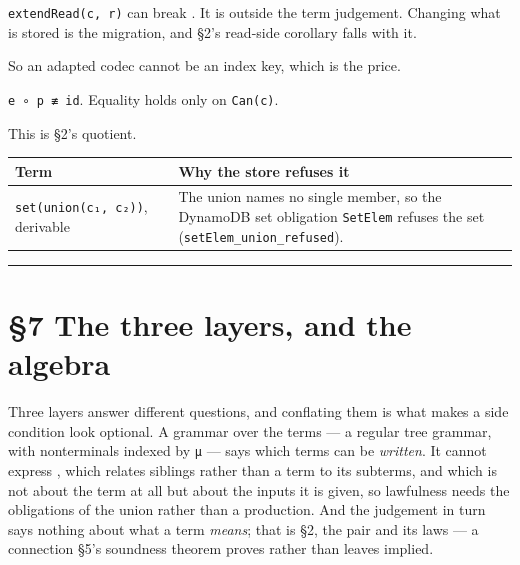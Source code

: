 \begin{theorem}
\label{eq:legacy-mp}
\leanok
\texttt{extendRead(c,\ r)} can break . It is outside the term
judgement. Changing what is stored is the migration, and §2's read-side corollary falls with it.
\end{theorem}

So an adapted codec cannot be an index key, which is the price.

\begin{theorem}
\label{eq:canonizer}
\leanok
\texttt{e\ ∘\ p\ ≢\ id}. Equality holds only on \texttt{Can(c)}.
\end{theorem}

This is §2's quotient.

\begin{tabular}{@{}ll@{}}
\toprule
Term & Why the store refuses it \\
\midrule
\texttt{set(union(c₁,\ c₂))}, derivable & The union names no single member, so the DynamoDB set obligation \texttt{SetElem} refuses the set (\texttt{setElem\_union\_refused}). \\
\bottomrule
\end{tabular}

\begin{center}\rule{0.5\linewidth}{0.5pt}\end{center}

\section{§7 The three layers, and the algebra}\label{7-the-three-layers-and-the-algebra}

Three layers answer different questions, and conflating them is what makes a side condition look
optional. A grammar over the terms — a regular tree grammar, with nonterminals indexed by \texttt{μ} — says
which terms can be \emph{written}. It cannot express , which relates siblings rather
than a term to its subterms, and which is not about the term at all but about the inputs it is
given, so lawfulness needs the obligations of the union rather than a production.
And the judgement in turn says nothing about what a term \emph{means}; that is §2, the pair and its laws —
a connection §5's soundness theorem proves rather than leaves implied.

